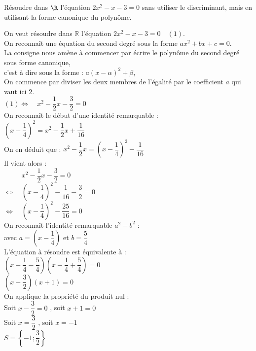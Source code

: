 \documentclass[a4paper,11pt,exos]{nsi} %
\begin{document}
\maketitle

\begin{exercice}
    Résoudre dans $\R$ l'équation $2x^2-x-3=0$ sans utiliser le discriminant, mais en utilisant la forme canonique du polynôme.
    
\end{exercice}

On veut résoudre dans $\mathbb{R}$ l'équation $2x^2-x-3=0\quad(1)$.\\On reconnaît une équation du second degré sous la forme $ax^2+bx+c = 0$.\\La consigne nous amène à commencer par écrire le polynôme du second degré sous forme canonique, \\c'est à dire sous la forme :  $a(x-\alpha)^2+\beta$,\\On commence par diviser les deux membres de l'égalité par le coefficient $a$ qui vaut ici $2$.\\$(1)\iff\quad x^2 -\dfrac{1}{2} x -\dfrac{3}{2}=0$\\On reconnaît le début d'une identité remarquable :\\$\left(x -\dfrac{1}{4}\right)^2=x^2 -\dfrac{1}{2}x+\dfrac{1}{16} $\\On en déduit que :  $x^2 -\dfrac{1}{2}x= \left(x -\dfrac{1}{4}\right)^2    -\dfrac{1}{16} $\\Il vient alors :\\$\phantom{\iff}\quad x^2 -\dfrac{1}{2} x -\dfrac{3}{2}=0$\\$\iff\quad  \left(x -\dfrac{1}{4}\right)^2    -\dfrac{1}{16}-\dfrac{3}{2}=0$\\$\iff\quad  \left(x -\dfrac{1}{4}\right)^2    -\dfrac{25}{16}=0$\\On reconnaît l'identité remarquable $a^2-b^2$ :\\avec  $a= \left(x -\dfrac{1}{4}\right)$ et $b =\dfrac{5}{4}$\\L'équation à résoudre est équivalente à :\\ $\left(x -\dfrac{1}{4}-\dfrac{5}{4}\right)\left(x -\dfrac{1}{4}+\dfrac{5}{4}\right)=0$\\ $\left(x -\dfrac{3}{2}\right)\left(x +1\right)=0$\\ On applique la propriété du produit nul :\\ Soit $x -\dfrac{3}{2}=0$ , soit $x +1=0$\\ Soit $x = \dfrac{3}{2}$ , soit $x = -1$\\ $S =\left\{-1;\dfrac{3}{2}\right\}$
\end{document}
